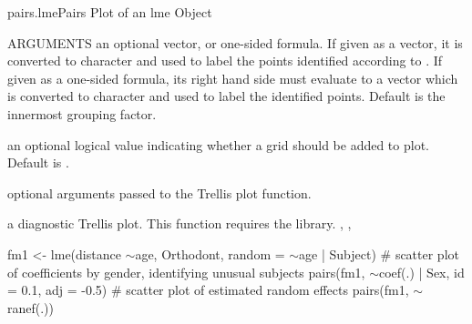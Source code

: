 \documentclass[pdftex]{article} \usepackage{url,graphicx}
\renewcommand{\Twiddle}{\mbox{\(\sim\)}}
\begin{document}
\begin{Helpfile}{pairs.lme}{Pairs Plot of an lme Object}
\begin{Argument}{ARGUMENTS}
an optional vector, or one-sided formula. If given as a
vector, it is converted to character and used to label the
points identified according to . If given as a
one-sided formula, its right hand side must evaluate to a vector
which is converted to character and used to label the identified
points. Default is the innermost grouping factor. 
\item[\Co{grid:}]
an optional logical value indicating whether a grid should
be added to plot. Default is .
\item[\Co{...:}]
optional arguments passed to the Trellis plot function.
\end{Argument}
a diagnostic Trellis plot.
 This function requires the  library.
, , 
\need 15pt
\vspace{-16pt} 
\begin{Example}
fm1 <- lme(distance \Twiddle age, Orthodont, random = \Twiddle age | Subject)
# scatter plot of coefficients by gender, identifying 
unusual subjects
pairs(fm1, \Twiddle coef(.) | Sex, id = 0.1, adj = -0.5)    
# scatter plot of estimated random effects
pairs(fm1, \Twiddle ranef(.))         
\end{Example}
\end{Helpfile}
\end{document}
